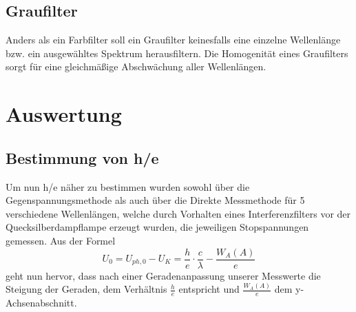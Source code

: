 \documentclass{scrartcl}
\begin{document}
	\subsection{Graufilter}
		Anders als ein Farbfilter soll ein Graufilter keinesfalls eine einzelne Wellenlänge bzw. ein ausgewähltes Spektrum 
		herausfiltern. Die Homogenität eines Graufilters sorgt für eine gleichmäßige Abschwächung aller Wellenlängen.
\section{Auswertung}
	\subsection{Bestimmung von h/e}
		Um nun h/e näher zu bestimmen wurden sowohl über die Gegenspannungsmethode als auch über die Direkte Messmethode
		für 5 verschiedene Wellenlängen, welche durch Vorhalten eines Interferenzfilters vor der Quecksilberdampflampe erzeugt wurden,
		die jeweiligen Stopspannungen gemessen. Aus der Formel
		\begin{equation}
			U_0 = U_{ph,0} - U_K = \frac{h}{e}\cdot \frac{c}{\lambda} - \frac{W_A(A)}{e}
		\end{equation}
		geht nun hervor, dass nach einer Geradenanpassung unserer Messwerte die Steigung der Geraden, dem Verhältnis
		$\frac{h}{e}$ entspricht und $\frac{W_A(A)}{e}$ dem y-Achsenabschnitt.
\end{document}
